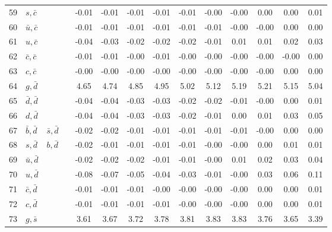 \begin{tabularx}{\textwidth}{rXXX@{}S@{}S@{}S@{}S@{}S@{}S@{}S@{}S@{}S@{}S}
 59 & $s, \bar c$      &                   &                  & -0.01 & -0.01 & -0.01 & -0.01 & -0.01 & -0.00 & -0.00 &  0.00 &  0.00 &  0.01 \\
 60 & $\bar u, \bar c$ &                   &                  & -0.01 & -0.01 & -0.01 & -0.01 & -0.01 & -0.01 & -0.00 & -0.00 &  0.00 &  0.00 \\
 61 & $u, \bar c$      &                   &                  & -0.04 & -0.03 & -0.02 & -0.02 & -0.02 & -0.01 &  0.01 &  0.01 &  0.02 &  0.03 \\
 62 & $\bar c, \bar c$ &                   &                  & -0.01 & -0.01 & -0.00 & -0.01 & -0.00 & -0.00 & -0.00 & -0.00 & -0.00 &  0.00 \\
 63 & $c, \bar c$      &                   &                  & -0.00 & -0.00 & -0.00 & -0.00 & -0.00 & -0.00 & -0.00 & -0.00 &  0.00 &  0.00 \\
 64 & $g, \bar d$      &                   &                  &  4.65 &  4.74 &  4.85 &  4.95 &  5.02 &  5.12 &  5.19 &  5.21 &  5.15 &  5.04 \\
 65 & $\bar d, \bar d$ &                   &                  & -0.04 & -0.04 & -0.03 & -0.03 & -0.02 & -0.02 & -0.01 & -0.00 &  0.00 &  0.01 \\
 66 & $d, \bar d$      &                   &                  & -0.04 & -0.04 & -0.03 & -0.03 & -0.02 & -0.01 &  0.00 &  0.01 &  0.03 &  0.05 \\
 67 & $\bar b, \bar d$ & $\bar s, \bar d$  &                  & -0.02 & -0.02 & -0.01 & -0.01 & -0.01 & -0.01 & -0.01 & -0.00 &  0.00 &  0.00 \\
 68 & $s, \bar d$      & $b, \bar d$       &                  & -0.02 & -0.01 & -0.01 & -0.01 & -0.01 & -0.00 & -0.00 &  0.00 &  0.01 &  0.01 \\
 69 & $\bar u, \bar d$ &                   &                  & -0.02 & -0.02 & -0.02 & -0.01 & -0.01 & -0.00 &  0.01 &  0.02 &  0.03 &  0.04 \\
 70 & $u, \bar d$      &                   &                  & -0.08 & -0.07 & -0.05 & -0.04 & -0.03 & -0.01 & -0.00 &  0.03 &  0.06 &  0.11 \\
 71 & $\bar c, \bar d$ &                   &                  & -0.01 & -0.01 & -0.01 & -0.00 & -0.00 & -0.00 & -0.00 &  0.00 &  0.00 &  0.01 \\
 72 & $c, \bar d$      &                   &                  & -0.01 & -0.01 & -0.01 & -0.01 & -0.00 & -0.00 & -0.00 &  0.00 &  0.00 &  0.01 \\
 73 & $g, \bar s$      &                   &                  &  3.61 &  3.67 &  3.72 &  3.78 &  3.81 &  3.83 &  3.83 &  3.76 &  3.65 &  3.39 \\

\end{tabularx}

